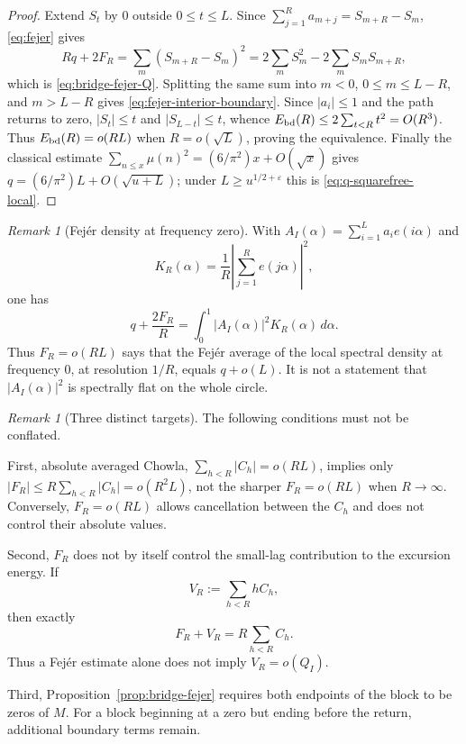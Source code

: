 \documentclass[11pt]{amsart}
\numberwithin{equation}{section}
\theoremstyle{plain}
\theoremstyle{definition}
\theoremstyle{remark}
\newtheorem{remark}[theorem]{Remark}
\newcommand{\eps}{\varepsilon}
\begin{document}
\begin{proof}
Extend $S_t$ by $0$ outside $0\le t\le L$. Since
$\sum_{j=1}^Ra_{m+j}=S_{m+R}-S_m$, \eqref{eq:fejer} gives
\[
Rq+2F_R=\sum_m(S_{m+R}-S_m)^2
=2\sum_mS_m^2-2\sum_mS_mS_{m+R},
\]
which is \eqref{eq:bridge-fejer-Q}. Splitting the same sum into
$m<0$, $0\le m\le L-R$, and $m>L-R$ gives
\eqref{eq:fejer-interior-boundary}. Since $|a_i|\le1$ and the path returns
to zero, $|S_t|\le t$ and $|S_{L-t}|\le t$, whence
$E_{\rm bd}(R)\le2\sum_{t<R}t^2=O(R^3)$. Thus
$E_{\rm bd}(R)=o(RL)$ when $R=o(\sqrt L)$, proving the equivalence.
Finally the classical estimate
$\sum_{n\le x}\mu(n)^2=(6/\pi^2)x+O(\sqrt x)$ gives
$q=(6/\pi^2)L+O(\sqrt{u+L})$; under $L\ge u^{1/2+\eps}$ this is
\eqref{eq:q-squarefree-local}.
\end{proof}

\begin{remark}[Fej\'er density at frequency zero]
\label{rem:fejer-spectrum}
With $A_I(\alpha)=\sum_{i=1}^La_ie(i\alpha)$ and
\[
K_R(\alpha)=\frac1R\left|\sum_{j=1}^Re(j\alpha)\right|^2,
\]
one has
\[
q+\frac{2F_R}{R}=\int_0^1|A_I(\alpha)|^2K_R(\alpha)\,d\alpha.
\]
Thus $F_R=o(RL)$ says that the Fej\'er average of the local spectral density
at frequency $0$, at resolution $1/R$, equals $q+o(L)$. It is not a
statement that $|A_I(\alpha)|^2$ is spectrally flat on the whole circle.
\end{remark}

\begin{remark}[Three distinct targets]
\label{rem:three-chowla-targets}
The following conditions must not be conflated.

First, absolute averaged Chowla,
$\sum_{h<R}|C_h|=o(RL)$, implies only
$|F_R|\le R\sum_{h<R}|C_h|=o(R^2L)$, not the sharper
$F_R=o(RL)$ when $R\to\infty$. Conversely, $F_R=o(RL)$ allows cancellation
between the $C_h$ and does not control their absolute values.

Second, $F_R$ does not by itself control the small-lag contribution to the
excursion energy. If
\[
V_R:=\sum_{h<R}hC_h,
\]
then exactly
\begin{equation}
\label{eq:F-V-relation}
F_R+V_R=R\sum_{h<R}C_h.
\end{equation}
Thus a Fej\'er estimate alone does not imply $V_R=o(Q_I)$.

Third, Proposition~\ref{prop:bridge-fejer} requires both endpoints of the
block to be zeros of $M$. For a block beginning at a zero but ending before
the return, additional boundary terms remain.
\end{remark}
\end{document}
